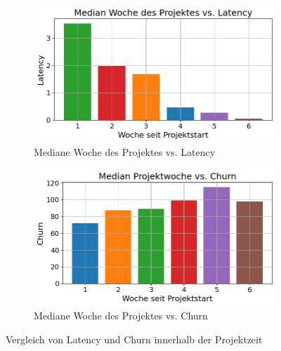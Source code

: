 \begin{figure}[htbp]
    \centering
    \begin{subfigure}[b]{0.48\textwidth}
        \centering
        \includegraphics[width=\textwidth]{Figures/mittelwert-woche-lateny.png}
        \caption{Mediane Woche des Projektes vs. Latency}
        \label{fig:mittelwert-woche-lateny}
    \end{subfigure}
    \hfill
    \begin{subfigure}[b]{0.48\textwidth}
        \centering
        \includegraphics[width=\textwidth]{Figures/mittelwert-woche-churn.png}
        \caption{Mediane Woche des Projektes vs. Churn}
        \label{fig:mittelwert-woche-churn}
    \end{subfigure}
    \caption{Vergleich von Latency und Churn innerhalb der Projektzeit}
    \label{fig:vergleich-latency-churn-projektzeit}
\end{figure}
\newpage

